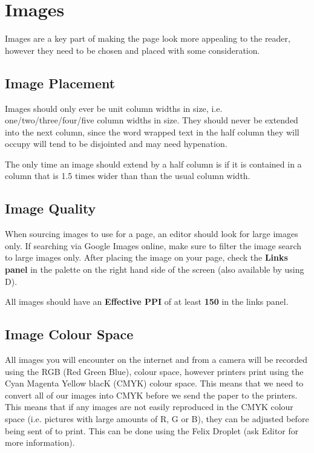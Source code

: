\chapter{Images}

Images are a key part of making the page look more appealing to the reader, however they need to be chosen and placed with some consideration.

\section{Image Placement}

Images should only ever be unit column widths in size, i.e. one/two/three/four/five column widths in size. They should never be extended into the next column, since the word wrapped text in the half column they will occupy will tend to be disjointed and may need hypenation.

The only time an image should extend by a half column is if it is contained in a column that is 1.5 times wider than than the usual column width. 

\section{Image Quality}

When sourcing images to use for a page, an editor should look for large images only. If searching via Google Images online, make sure to filter the image search to large images only. After placing the image on your page, check the \textbf{Links panel} in the palette on the right hand side of the screen (also available by using \shiftkey \cmdkey D).

All images should have an \textbf{Effective PPI} of at least \textbf{150} in the links panel.


\section{Image Colour Space}

All images you will encounter on the internet and from a camera will be recorded using the RGB (Red Green Blue), colour space, however printers print using the Cyan Magenta Yellow blacK (CMYK) colour space. This means that we need to convert all of our images into CMYK before we send the paper to the printers. This means that if any images are not easily reproduced in the CMYK colour space (i.e. pictures with large amounts of R, G or B), they can be adjusted before being sent of to print. This can be done using the Felix Droplet (ask Editor for more information).

